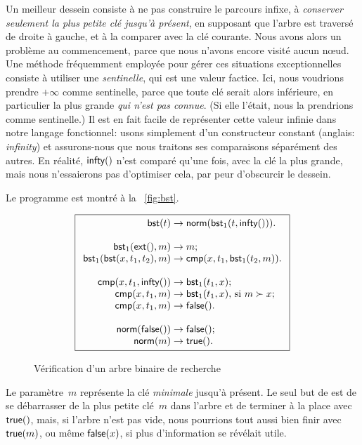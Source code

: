 Un meilleur dessein consiste à ne pas construire le parcours infixe, à
\emph{conserver seulement la plus petite clé jusqu'à présent}, en
supposant que l'arbre est traversé de droite à gauche, et à la
comparer avec la clé courante. Nous avons alors un problème au
commencement, parce que nous n'avons encore visité aucun nœud. Une
méthode fréquemment employée pour gérer ces situations exceptionnelles
consiste à utiliser une \emph{sentinelle}, qui est
une valeur factice. Ici, nous voudrions prendre \(+\infty\) comme
sentinelle, parce que toute clé serait alors inférieure, en
particulier la plus grande \emph{qui n'est pas connue}. (Si elle
l'était, nous la prendrions comme sentinelle.) Il est en fait facile
de représenter cette valeur infinie dans notre langage fonctionnel:
usons simplement d'un constructeur constant
 (anglais: \emph{infinity}) et
assurons-nous que nous traitons ses comparaisons séparément des
autres. En réalité, \(\textsf{infty}()\) n'est
comparé qu'une fois, avec la clé la plus grande, mais nous
n'essaierons pas d'optimiser cela, par peur d'obscurcir le dessein.

Le programme est montré à la
\fig~\vref{fig:bst}.
\begin{figure}[t]
\begin{equation*}
\boxed{
\begin{array}{r@{\;}l@{\;}l}
  \fun{bst}(t) & \rightarrow & \fun{norm}(\fun{bst}_1(t,\fun{infty}())).\\
  \\
  \fun{bst}_1(\fun{ext}(),m) & \rightarrow & m;\\
  \fun{bst}_1(\fun{bst}(x,t_1,t_2),m) & \rightarrow &
  \fun{cmp}(x,t_1,\fun{bst}_1(t_2,m)).\\
\\
\fun{cmp}(x,t_1,\fun{infty}()) & \rightarrow & \fun{bst}_1(t_1,x);\\
\fun{cmp}(x,t_1,m) & \rightarrow &
  \fun{bst}_1(t_1,x), \,\text{si \(m \succ x\)};\\
\fun{cmp}(x,t_1,m) & \rightarrow & \fun{false}().\\
\\
\fun{norm}(\fun{false}()) & \rightarrow & \fun{false}();\\
\fun{norm}(m) & \rightarrow & \fun{true}().
\end{array}}
\end{equation*}
\caption{Vérification d'un arbre binaire de recherche}
\label{fig:bst}
\end{figure}
Le paramètre~\(m\) représente la clé \emph{minimale} jusqu'à
présent. Le seul but de  est de
se débarrasser de la plus petite clé~\(m\) dans l'arbre et de terminer
à la place avec \(\textsf{true}()\), mais, si l'arbre n'est pas vide,
nous pourrions tout aussi bien finir avec \(\textsf{true}(m)\), ou même
\(\textsf{false}(x)\), si plus d'information se révélait
utile.

